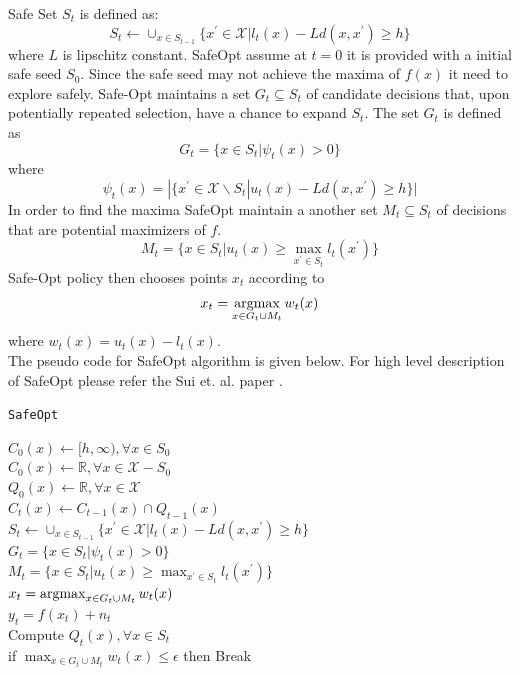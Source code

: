 Safe Set $S_t$ is defined as:
$$ S_t \gets \cup_{x\in S_{t-1}}\{ x^\prime \in \mathcal{X} | l_t(x) - Ld(x,x^\prime) \geq h \} $$
where $L$ is lipschitz constant. 
SafeOpt assume at $t = 0$ it is provided with a initial safe seed $S_0$. 
Since the safe seed may not achieve the maxima of $f(x)$ it need to explore safely.
Safe-Opt maintains a set $G_t \subseteq S_t$ of candidate decisions that, upon potentially repeated selection, have a chance to expand $S_t$. The set $G_t$ is defined as
$$ G_t = \{x \in S_t | \psi_t(x) > 0 \} $$
where
$$ \psi_t(x) = |\{ x^\prime \in \mathcal{X} \backslash S_t | u_t(x) - Ld(x,x^\prime) \geq h \}| $$
In order to find the maxima SafeOpt maintain a another set $M_t \subseteq S_t$ of decisions that are potential maximizers of $f$.
$$ M_t = \{ x \in S_t |u_t(x) \geq \max_{x^\prime \in S_t} l_t(x^\prime) \} $$
Safe-Opt policy then chooses points $x_t$ according to $$ x_t = \operatorname*{argmax}_{x\in G_t \cup M_t}w_t(x) $$
where $w_t(x)=u_t(x)-l_t(x)$.\\
The pseudo code for SafeOpt algorithm is given below. For high level description of SafeOpt please refer the Sui et. al. paper \cite{sui15}.
\begin{algorithm}
	\caption{\texttt{SafeOpt}}
	$C_0(x) \gets [h, \infty), \forall x \in S_0$\\
	$C_0(x) \gets \mathbb{R}, \forall x \in \mathcal{X} - S_0$\\
	$Q_0(x) \gets \mathbb{R}, \forall x \in \mathcal{X}$\\
	{
		$C_t(x) \gets C_{t-1}(x) \cap Q_{t-1}(x)$\\
		$S_t \gets \cup_{x\in S_{t-1}}\{ x^\prime \in \mathcal{X} | l_t(x) - Ld(x,x^\prime) \geq h \}$\\
		$G_t = \{x \in S_t | \psi_t(x) > 0 \}$\\
		$M_t = \{ x \in S_t |u_t(x) \geq \max_{x^\prime \in S_t} l_t(x^\prime) \}$\\
		$x_t = \operatorname*{argmax}_{x\in G_t \cup M_t}w_t(x)$\\
		$y_t = f(x_t)+n_t$\\
		Compute $Q_t(x), \forall x \in S_t$\\
		if $\max_{ x\in G_t \cup M_t}w_t(x) \leq \epsilon$ then Break
	}
\end{algorithm}

